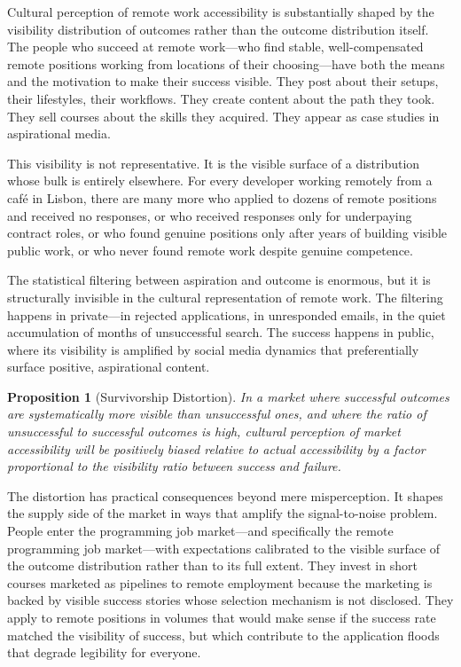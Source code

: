 \documentclass[12pt, a4paper]{article}
\theoremstyle{plain}
\newtheorem{proposition}{Proposition}[section]
\theoremstyle{definition}
\theoremstyle{remark}
\begin{document}
Cultural perception of remote work accessibility is substantially shaped by
the visibility distribution of outcomes rather than the outcome distribution itself.
The people who succeed at remote work---who find stable, well-compensated remote positions
working from locations of their choosing---have both the means and the motivation
to make their success visible.
They post about their setups, their lifestyles, their workflows.
They create content about the path they took.
They sell courses about the skills they acquired.
They appear as case studies in aspirational media.

This visibility is not representative.
It is the visible surface of a distribution whose bulk is entirely elsewhere.
For every developer working remotely from a café in Lisbon,
there are many more who applied to dozens of remote positions
and received no responses, or who received responses only for underpaying contract roles,
or who found genuine positions only after years of building visible public work,
or who never found remote work despite genuine competence.

The statistical filtering between aspiration and outcome is enormous,
but it is structurally invisible in the cultural representation of remote work.
The filtering happens in private---in rejected applications, in unresponded emails,
in the quiet accumulation of months of unsuccessful search.
The success happens in public, where its visibility is amplified by
social media dynamics that preferentially surface positive, aspirational content.

\begin{proposition}[Survivorship Distortion]
In a market where successful outcomes are systematically more visible than
unsuccessful ones, and where the ratio of unsuccessful to successful outcomes
is high, cultural perception of market accessibility will be positively biased
relative to actual accessibility by a factor proportional to the
visibility ratio between success and failure.
\end{proposition}

The distortion has practical consequences beyond mere misperception.
It shapes the supply side of the market in ways that amplify the signal-to-noise problem.
People enter the programming job market---and specifically the remote programming job market---with
expectations calibrated to the visible surface of the outcome distribution
rather than to its full extent.
They invest in short courses marketed as pipelines to remote employment
because the marketing is backed by visible success stories whose selection mechanism
is not disclosed.
They apply to remote positions in volumes that would make sense if the
success rate matched the visibility of success, but which contribute to
the application floods that degrade legibility for everyone.
\end{document}
